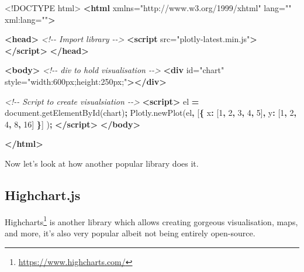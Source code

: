 \documentclass[
]{krantz}
\makeatletter
\newenvironment{Shaded}{\begin{snugshade}}{\end{snugshade}}
\newcommand{\AttributeTok}[1]{\textcolor[rgb]{0.61,0.61,0.61}{#1}}
\newcommand{\CommentTok}[1]{\textcolor[rgb]{0.37,0.37,0.37}{\textit{#1}}}
\newcommand{\DataTypeTok}[1]{\textcolor[rgb]{0.27,0.27,0.27}{#1}}
\newcommand{\DecValTok}[1]{\textcolor[rgb]{0.06,0.06,0.06}{#1}}
\newcommand{\KeywordTok}[1]{\textcolor[rgb]{0.27,0.27,0.27}{\textbf{#1}}}
\newcommand{\NormalTok}[1]{#1}
\newcommand{\OperatorTok}[1]{\textcolor[rgb]{0.43,0.43,0.43}{\textbf{#1}}}
\newcommand{\OtherTok}[1]{\textcolor[rgb]{0.37,0.37,0.37}{#1}}
\newcommand{\StringTok}[1]{\textcolor[rgb]{0.5,0.5,0.5}{#1}}
\newcommand{\VariableTok}[1]{\textcolor[rgb]{0,0,0}{#1}}
\renewcommand{\href}[2]{#2\footnote{\url{#1}}}
\newenvironment{kframe}{%
\medskip{}
\setlength{\fboxsep}{.8em}
 \def\at@end@of@kframe{}%
 \ifinner\ifhmode%
  \def\at@end@of@kframe{\end{minipage}}%
  \begin{minipage}{\columnwidth}%
 \fi\fi%
 \def\FrameCommand##1{\hskip\@totalleftmargin \hskip-\fboxsep
 \colorbox{shadecolor}{##1}\hskip-\fboxsep
     \hskip-\linewidth \hskip-\@totalleftmargin \hskip\columnwidth}%
 \MakeFramed {\advance\hsize-\width
   \@totalleftmargin\z@ \linewidth\hsize
   \@setminipage}}%
 {\par\unskip\endMakeFramed%
 \at@end@of@kframe}
\renewenvironment{Shaded}{\begin{kframe}}{\end{kframe}}
\makeatother
\begin{document}
\begin{Shaded}
\begin{Highlighting}[]
\DataTypeTok{<!DOCTYPE }\NormalTok{html}\DataTypeTok{>}
\KeywordTok{<html}\OtherTok{ xmlns=}\StringTok{"http://www.w3.org/1999/xhtml"}\OtherTok{ lang=}\StringTok{""}\OtherTok{ xml:lang=}\StringTok{""}\KeywordTok{>}

\KeywordTok{<head>}
  \CommentTok{<!{-}{-} Import library {-}{-}>}
  \KeywordTok{<script}\OtherTok{ src=}\StringTok{"plotly{-}latest.min.js"}\KeywordTok{></script>}
\KeywordTok{</head>}

\KeywordTok{<body>}
  \CommentTok{<!{-}{-} div to hold visualisation {-}{-}>}
  \KeywordTok{<div}\OtherTok{ id=}\StringTok{"chart"}\OtherTok{ style=}\StringTok{"width:600px;height:250px;"}\KeywordTok{></div>}

  \CommentTok{<!{-}{-} Script to create visualsiation {-}{-}>}
  \KeywordTok{<script>}
\NormalTok{    el }\OperatorTok{=} \VariableTok{document}\NormalTok{.}\AttributeTok{getElementById}\NormalTok{(}\StringTok{\textquotesingle{}chart\textquotesingle{}}\NormalTok{)}\OperatorTok{;}
    \VariableTok{Plotly}\NormalTok{.}\AttributeTok{newPlot}\NormalTok{(el}\OperatorTok{,}\NormalTok{ [}\OperatorTok{\{}
      \DataTypeTok{x}\OperatorTok{:}\NormalTok{ [}\DecValTok{1}\OperatorTok{,} \DecValTok{2}\OperatorTok{,} \DecValTok{3}\OperatorTok{,} \DecValTok{4}\OperatorTok{,} \DecValTok{5}\NormalTok{]}\OperatorTok{,}
      \DataTypeTok{y}\OperatorTok{:}\NormalTok{ [}\DecValTok{1}\OperatorTok{,} \DecValTok{2}\OperatorTok{,} \DecValTok{4}\OperatorTok{,} \DecValTok{8}\OperatorTok{,} \DecValTok{16}\NormalTok{] }\OperatorTok{\}}\NormalTok{]}
\NormalTok{    )}\OperatorTok{;}
  \KeywordTok{</script>}
\KeywordTok{</body>}

\KeywordTok{</html>}
\end{Highlighting}
\end{Shaded}

Now let's look at how another popular library does it.

\hypertarget{highchart.js}{%
\subsection*{Highchart.js}\label{highchart.js}}


\href{https://www.highcharts.com/}{Highcharts} is another library which allows creating gorgeous visualisation, maps, and more, it's also very popular albeit not being entirely open-source.
\end{document}
